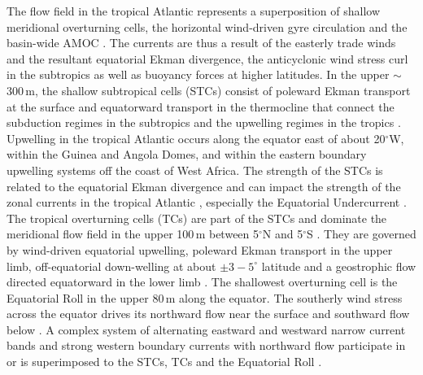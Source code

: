 \documentclass[os, manuscript]{copernicus}
\begin{document}
The flow field in the tropical Atlantic represents a superposition of shallow meridional overturning cells, the horizontal wind-driven gyre circulation and the basin-wide AMOC \citep[ e.g.][]{Schott2004,Hazeleger2006,Perez2014,Tuchen2022,Heukamp2022}. The currents are thus a result of the easterly trade winds and the resultant equatorial Ekman divergence, the anticyclonic wind stress curl in the subtropics as well as buoyancy forces at higher latitudes. In the upper $ \sim $300$\,$m, the shallow subtropical cells (STCs) consist of poleward Ekman transport at the surface and equatorward transport in the thermocline that connect the subduction regimes in the subtropics and the upwelling regimes in the tropics \citep{Schott2004}. Upwelling in the tropical Atlantic occurs along the equator east of about 20$^{\circ}$W, within the Guinea and Angola Domes, and within the eastern boundary upwelling systems off the coast of West Africa. The strength of the STCs is related to the equatorial Ekman divergence \citep{Tuchen2019,Rabe2008} and can impact the strength of the zonal currents in the tropical Atlantic \citep{Rabe2008}, especially the Equatorial Undercurrent \cite[EUC;][]{Brandt2021a}. The tropical overturning cells (TCs) are part of the STCs and dominate the meridional flow field in the upper 100$\,$m between 5$^{\circ}$N and 5$^{\circ}$S \citep[e.g.][]{McCreary1994,Schott2004,Molinari2003,Perez2014}. They are governed by wind-driven equatorial upwelling, poleward Ekman transport in the upper limb, off-equatorial down-welling at about $ \pm3-5^{\circ}$ latitude and a geostrophic flow directed equatorward in the lower limb \citep[e.g.][]{Perez2014}. The shallowest overturning cell is the Equatorial Roll in the upper 80$\,$m along the equator. The southerly wind stress across the equator drives its northward flow near the surface and southward flow below \citep{Heukamp2022}. A complex system of alternating eastward and westward narrow current bands and strong western boundary currents with northward flow participate in or is superimposed to the STCs, TCs and the Equatorial Roll \citep[e.g.][]{Schott2004}. 
\end{document}
